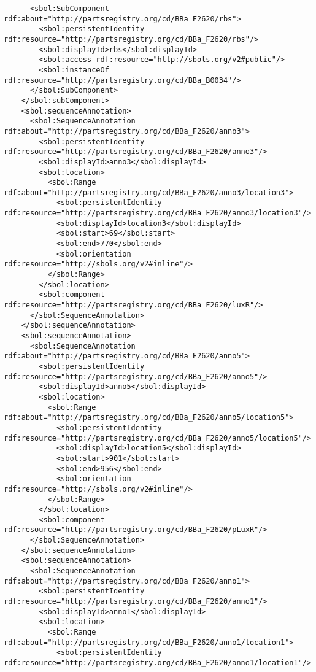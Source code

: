 \begin{lstlisting}
      <sbol:SubComponent rdf:about="http://partsregistry.org/cd/BBa_F2620/rbs">
        <sbol:persistentIdentity rdf:resource="http://partsregistry.org/cd/BBa_F2620/rbs"/>
        <sbol:displayId>rbs</sbol:displayId>
        <sbol:access rdf:resource="http://sbols.org/v2#public"/>
        <sbol:instanceOf rdf:resource="http://partsregistry.org/cd/BBa_B0034"/>
      </sbol:SubComponent>
    </sbol:subComponent>
    <sbol:sequenceAnnotation>
      <sbol:SequenceAnnotation rdf:about="http://partsregistry.org/cd/BBa_F2620/anno3">
        <sbol:persistentIdentity rdf:resource="http://partsregistry.org/cd/BBa_F2620/anno3"/>
        <sbol:displayId>anno3</sbol:displayId>
        <sbol:location>
          <sbol:Range rdf:about="http://partsregistry.org/cd/BBa_F2620/anno3/location3">
            <sbol:persistentIdentity rdf:resource="http://partsregistry.org/cd/BBa_F2620/anno3/location3"/>
            <sbol:displayId>location3</sbol:displayId>
            <sbol:start>69</sbol:start>
            <sbol:end>770</sbol:end>
            <sbol:orientation rdf:resource="http://sbols.org/v2#inline"/>
          </sbol:Range>
        </sbol:location>
        <sbol:component rdf:resource="http://partsregistry.org/cd/BBa_F2620/luxR"/>
      </sbol:SequenceAnnotation>
    </sbol:sequenceAnnotation>
    <sbol:sequenceAnnotation>
      <sbol:SequenceAnnotation rdf:about="http://partsregistry.org/cd/BBa_F2620/anno5">
        <sbol:persistentIdentity rdf:resource="http://partsregistry.org/cd/BBa_F2620/anno5"/>
        <sbol:displayId>anno5</sbol:displayId>
        <sbol:location>
          <sbol:Range rdf:about="http://partsregistry.org/cd/BBa_F2620/anno5/location5">
            <sbol:persistentIdentity rdf:resource="http://partsregistry.org/cd/BBa_F2620/anno5/location5"/>
            <sbol:displayId>location5</sbol:displayId>
            <sbol:start>901</sbol:start>
            <sbol:end>956</sbol:end>
            <sbol:orientation rdf:resource="http://sbols.org/v2#inline"/>
          </sbol:Range>
        </sbol:location>
        <sbol:component rdf:resource="http://partsregistry.org/cd/BBa_F2620/pLuxR"/>
      </sbol:SequenceAnnotation>
    </sbol:sequenceAnnotation>
    <sbol:sequenceAnnotation>
      <sbol:SequenceAnnotation rdf:about="http://partsregistry.org/cd/BBa_F2620/anno1">
        <sbol:persistentIdentity rdf:resource="http://partsregistry.org/cd/BBa_F2620/anno1"/>
        <sbol:displayId>anno1</sbol:displayId>
        <sbol:location>
          <sbol:Range rdf:about="http://partsregistry.org/cd/BBa_F2620/anno1/location1">
            <sbol:persistentIdentity rdf:resource="http://partsregistry.org/cd/BBa_F2620/anno1/location1"/>

\end{lstlisting}
